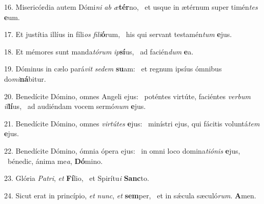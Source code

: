 16. Misericórdia autem Dómi\textit{ni} \textit{ab} \textit{æ}\textbf{tér}no, \ast\  et usque in ætérnum super timén\textit{tes} \textbf{e}um.\

17. Et justítia illíus in fíli\textit{os} \textit{fi}\textit{li}\textbf{ó}rum, \ast\  his qui servant testamén\textit{tum} \textbf{e}jus.\

18. Et mémores sunt manda\textit{tó}\textit{rum} \textit{ip}\textbf{sí}us, \ast\  ad facién\textit{dum} \textbf{e}a.\

19. Dóminus in cælo pará\textit{vit} \textit{se}\textit{dem} \textbf{su}am: \ast\  et regnum ipsíus ómnibus do\textit{mi}\textbf{ná}bitur.\

20. Benedícite Dómino, omnes Angeli ejus: \dag\  poténtes virtúte, faciéntes \textit{ver}\textit{bum} \textit{il}\textbf{lí}us, \ast\  ad audiéndam vocem sermó\textit{num} \textbf{e}jus.\

21. Benedícite Dómino, omnes \textit{vir}\textit{tú}\textit{tes} \textbf{e}jus: \ast\  minístri ejus, qui fácitis voluntá\textit{tem} \textbf{e}jus.\

22. Benedícite Dómino, ómnia ópera ejus: \dag\  in omni loco domina\textit{ti}\textit{ó}\textit{nis} \textbf{e}jus, \ast\  bénedic, ánima me\textit{a}, \textbf{Dó}mino.\

23. Glória \textit{Pa}\textit{tri}, \textit{et} \textbf{Fí}lio, \ast\  et Spirítu\textit{i} \textbf{Sanc}to.\

24. Sicut erat in princípio, \textit{et} \textit{nunc}, \textit{et} \textbf{sem}per, \ast\  et in sǽcula sæculó\textit{rum}. \textbf{A}men.\


